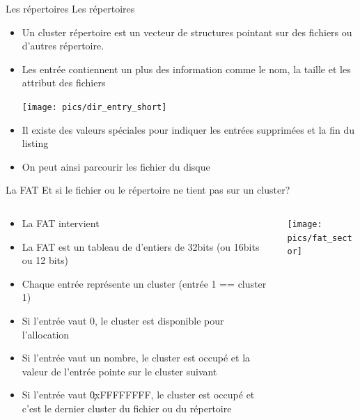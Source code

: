 \begin{frame}[fragile=singleslide]{Les répertoires}
  Les répertoires
  \begin{itemize}
  \item Un  cluster répertoire est  un vecteur de  structures pointant
    sur des fichiers ou d'autres répertoire.
  \item Les entrée  contiennent un plus des information  comme le nom,
    la taille et les attribut des fichiers
    \begin{center}
      \texttt{[image: pics/dir\_entry\_short]}
    \end{center}
  \item  Il existe  des valeurs  spéciales pour  indiquer  les entrées
    supprimées et la fin du listing
  \item On peut ainsi parcourir les fichier du disque
  \end{itemize}
\end{frame}

\begin{frame}[fragile=singleslide]{La FAT}
  Et si le fichier ou le répertoire ne tient pas sur un cluster?
  \begin{columns}
    \begin{column}{7cm}
      \begin{itemize}
      \item La FAT intervient
      \item La FAT est un tableau de d'entiers de 32bits (ou 16bits ou
        12 bits)
      \item Chaque  entrée représente un cluster (entrée  1 == cluster
        1)
      \item  Si  l'entrée  vaut  0,  le cluster  est  disponible  pour
        l'allocation
      \item Si  l'entrée vaut un nombre,  le cluster est  occupé et la
        valeur de l'entrée pointe sur le cluster suivant
      \item Si l'entrée vaut  \c{0xFFFFFFFF}, le cluster est occupé et
        c'est le dernier cluster du fichier ou du répertoire
      \end{itemize}
    \end{column}
    \begin{column}{5cm}
      \texttt{[image: pics/fat\_sector]}
    \end{column}
  \end{columns}
\end{frame}

